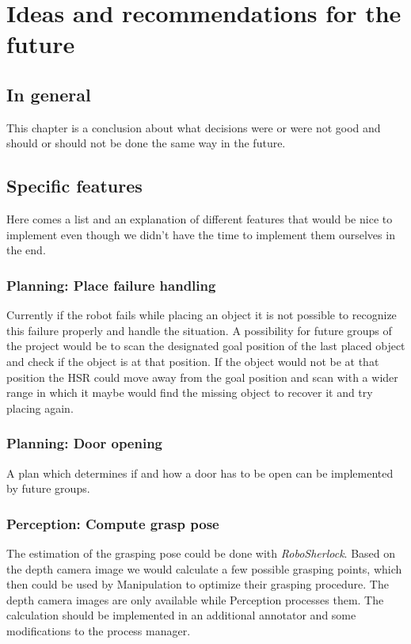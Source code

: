 \documentclass[main.tex]{subfiles}
\begin{document}
	\begingroup

	\renewcommand{\cleardoublepage}{}

	\renewcommand{\clearpage}{}

	\chapter{Ideas and recommendations for the future}
		
		\section{In general}
				\chapterauthor{}
		This chapter is a conclusion about what decisions were or were not good and should or should not be done the same way in the future.
		
		\section{Specific features}
		Here comes a list and an explanation of different features that would be nice to implement even though we didn't have the time to implement them ourselves in the end.
		
		\subsection{Planning: Place failure handling}
		Currently if the robot fails while placing an object it is not possible to recognize this failure properly and handle the situation. A possibility for future groups of the project would be to scan the designated goal position of the last placed object and check if the object is at that position. If the object would not be at that position the HSR could move away from the goal position and scan with a wider range in which it maybe would find the missing object to recover it and try placing again.
		
		\subsection{Planning: Door opening}
		A plan which determines if and how a door has to be open can be implemented by future groups.
		
		
		\subsection{Perception: Compute grasp pose}
		The estimation of the grasping pose could be done with \textit{RoboSherlock}. Based on the depth camera image we would calculate a few possible grasping points, which then could be used by Manipulation to optimize their grasping procedure. The depth camera images are only available while Perception processes them. The calculation should be implemented in an additional annotator and some modifications to the process manager.
		
\end{document}
